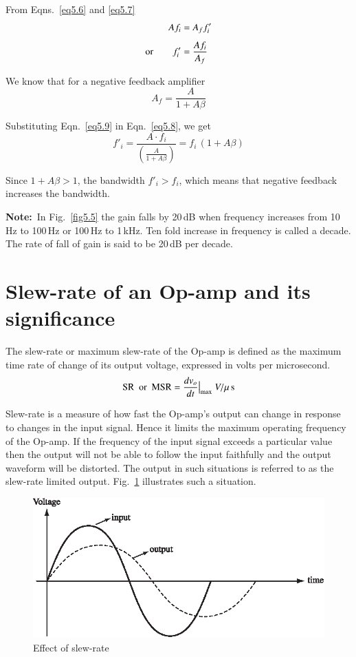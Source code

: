 From Eqns.~\eqref{eq5.6} and \eqref{eq5.7}
\begin{align}
Af_{i} &= A_{f}f'_{i}\notag\\[4pt]
\text{or}\qquad f'_{i} &= \frac{Af_{i}}{A_{f}}\label{eq5.8}
\end{align}

We know that for a negative feedback amplifier
\begin{equation}
A_{f}=\frac{A}{1+A\beta}\label{eq5.9}
\end{equation}

Substituting Eqn.~\eqref{eq5.9} in Eqn.~\eqref{eq5.8}, we get
\begin{equation}
f'_{i}=\frac{A\cdot f_{i}}{\left(\frac{A}{1+A\beta}\right)}=f_{i}\,(1+A\beta)\label{eq5.10}
\end{equation}

Since $1+A\beta>1$, the bandwidth $f'_{i}>f_{i}$, which means that negative feedback increases the bandwidth.

\smallskip
\noindent
{\bf Note:}~In Fig.~\ref{fig5.5} the gain falls by 20\,dB when frequency increases from 10\,Hz to 100\,Hz or 100\,Hz to 1\,kHz. Ten fold increase in frequency is called a decade. The rate of fall of gain is said to be 20\,dB per decade.

\section{Slew-rate of an Op-amp and its significance}\label{sec5.4}

The slew-rate or maximum slew-rate of the Op-amp is defined as the maximum time rate of change of its output voltage, expressed in volts per microsecond.
\begin{equation}
\text{SR~ or~ MSR} =\frac{dv_{o}}{dt}\big|_{\max} \ V/\mu \text{\,s}\label{eq5.11}
\end{equation}

Slew-rate is a measure of how fast the Op-amp's output can change in response to changes in the input signal. Hence it limits the maximum operating frequency of the Op-amp. If the frequency of the input signal exceeds a particular value then the output will not be able to follow the input faithfully and the output waveform will be distorted. The output in such situations is referred to as the slew-rate limited output. Fig.~\ref{fig5.6} illustrates such a situation.
\begin{figure}[H]
\centering
\includegraphics[scale=1.2]{chap4/S3-EE-06-008.eps}
\caption{Effect of slew-rate}\label{fig5.6}
\end{figure}

